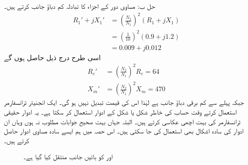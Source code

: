 حل ب:\quad
مساوی دور کے اجزاء کا تبادلہ کم دباؤ جانب کرتے ہیں۔
\begin{align*}
R_1'+j X_1' &=\left(\frac{N_2}{N_1} \right)^2 \left(R_1+j X_1 \right)\\
&=\left(\frac{1}{10} \right)^2 \left(0.9+j1.2 \right)\\
&=0.009+j0.012
\end{align*}
اسی طرح درج ذیل حاصل ہوں گے
\begin{align*}
R_c'&=\left(\frac{N_2}{N_1} \right)^2 R_c=64\\
X_m'&=\left(\frac{N_2}{N_1} \right)^2 X_m=470
\end{align*}
جبکہ  پہلے سے کم برقی دباؤ جانب ہے لہٰذا اس کی قیمت تبدیل نہیں ہو گی۔
%
ایک انجنیئر  ٹرانسفارمر استعمال کرتے وقت حساب کی خاطر شکل  یا شکل  کے ادوار استعمال کر سکتا ہے۔ یہ ادوار حقیقی ٹرانسفارمر کی بہت اچھی عکاسی کرتے ہیں۔ البتہ جہاں بہت صحیح جوابات مطلوب نہ ہوں وہاں ان ادوار کی سادہ اشکال بھی استعمال کی جا سکتی ہیں۔ اس حصہ میں ہم ایسے  سادہ مساوی ادوار حاصل کرتے ہیں۔
\begin{figure}
\centering
\caption{ اور  کو بائیں جانب منتقل کیا گیا ہے۔}
\label{شکل_ٹرانسفارمر_بائیں_جانب}
\end{figure}
